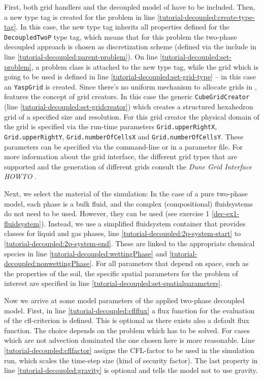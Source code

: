 First, both \Dune  grid handlers and the decoupled model of \Dumux
have to be included. Then, a new type tag is created for the problem
in line \ref{tutorial-decoupled:create-type-tag}.  In this case, the
new type tag inherits all properties defined for the \texttt{DecoupledTwoP}
type tag, which means that for this problem the two-phase decoupled approach
is chosen as discretization scheme (defined via the include in line
\ref{tutorial-decoupled:parent-problem}). On line \ref{tutorial-decoupled:set-problem},
a problem class is attached to the new type tag, while the grid which
is going to be used is defined in line \ref{tutorial-decoupled:set-grid-type} --
in this case an \texttt{YaspGrid} is created. Since there's no uniform mechanism to
allocate grids in \Dune, \Dumux features the concept of grid creators.
In this case the generic \texttt{CubeGridCreator} (line \ref{tutorial-decoupled:set-gridcreator}) which creates a
structured hexahedron grid of a specified size and resolution. For
this grid creator the  physical domain of the grid is specified via the
run-time parameters \texttt{Grid.upperRightX},
\texttt{Grid.upperRightY}, \texttt{Grid.numberOfCellsX} and
\texttt{Grid.numberOfCellsY}. These parameters can be specified via
the command-line or in a parameter file.
For more information about the \Dune grid interface, the different grid types
that are supported and the generation of different grids consult
the \textit{Dune Grid Interface HOWTO} \cite{DUNE-HP}.

Next, we select the material of the simulation: In the case of a pure two-phase
model, each phase is a bulk fluid, and the complex (compositional) fluidsystems
do not need to be used. However, they can be used (see exercise 1 \ref{dec-ex1-fluidsystem}).
Instead, we use a simplified fluidsystem container that provides classes
for liquid and gas phases, line \ref{tutorial-decoupled:2p-system-start} to
\ref{tutorial-decoupled:2p-system-end}. These are linked to the appropriate
chemical species in line \ref{tutorial-decoupled:wettingPhase} and
\ref{tutorial-decoupled:nonwettingPhase}. For all parameters that depend
on space, such as the properties of the soil, the specific spatial parameters
for the problem of interest are specified in line
\ref{tutorial-decoupled:set-spatialparameters}.

Now we arrive at some model parameters of the applied two-phase decoupled
model. First, in line  \ref{tutorial-decoupled:cflflux} a flux function for the
evaluation of the cfl-criterion is defined. This is optional as there exists also
a default flux function. The choice depends on the problem which has to be solved.
For cases which are not advection dominated the one chosen here is more reasonable.
Line \ref{tutorial-decoupled:cflfactor} assigns the CFL-factor to be used in the
simulation run, which scales the time-step size (kind of security factor). The last
property in line \ref{tutorial-decoupled:gravity}
is optional and tells the model not to use gravity.

